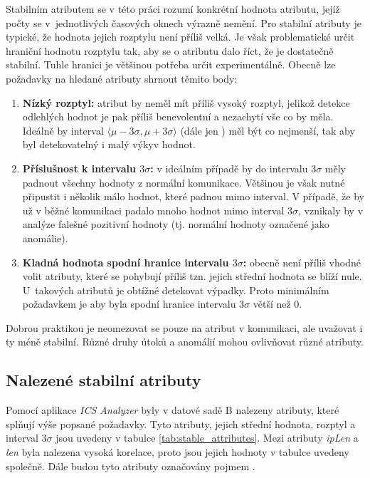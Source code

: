 Stabilním atributem se v této práci rozumí konkrétní hodnota atributu, jejíž počty se v~jednotlivých časových oknech výrazně nemění. Pro stabilní atributy je typické, že hodnota jejich rozptylu není příliš velká. Je však problematické určit hraniční hodnotu rozptylu tak, aby se o atributu dalo říct, že je dostatečně stabilní. Tuhle hranici je většinou potřeba určit experimentálně.
Obecně lze požadavky na hledané atributy shrnout těmito body:


\begin{enumerate}
    \item \textbf{Nízký rozptyl:} atribut by neměl mít příliš vysoký rozptyl, jelikož detekce odlehlých hodnot je pak příliš benevolentní a nezachytí vše co by měla. Ideálně by interval $\langle{\mu-3\sigma,\mu+3\sigma}\rangle$ (dále jen ) měl být co nejmenší, tak aby byl detekovatelný i malý výkyv hodnot.
    \item \textbf{Příslušnost k intervalu $3\sigma$:} v ideálním případě by do intervalu $3\sigma$ měly padnout všechny hodnoty z normální komunikace. Většinou je však nutné připustit i několik málo hodnot, které padnou mimo interval. V případě, že by už v běžné komunikaci padalo mnoho hodnot mimo interval $3\sigma$, vznikaly by v analýze falešné pozitivní hodnoty (tj. normální hodnoty označené jako anomálie).
    \item \textbf{Kladná hodnota spodní hranice intervalu $3\sigma$:} obecně není příliš vhodné volit atributy, které se pohybují příliš  tzn. jejich střední hodnota se blíží nule. U~takových atributů je obtížné detekovat výpadky. Proto minimálním požadavkem je aby byla spodní hranice intervalu $3\sigma$ větší než 0.
\end{enumerate}

\noindent Dobrou praktikou je neomezovat se pouze na  atribut v komunikaci, ale uvažovat i ty méně stabilní. Různé druhy útoků a anomálií mohou ovlivňovat různé atributy.

\subsection*{Nalezené stabilní atributy}

Pomocí aplikace \emph{ICS Analyzer} byly v datové sadě B nalezeny atributy, které splňují výše popsané požadavky. Tyto atributy, jejich střední hodnota, rozptyl a interval $3\sigma$ jsou uvedeny v tabulce \ref{tab:stable_attributes}. Mezi atributy \emph{ipLen} a \emph{len} byla nalezena vysoká korelace, proto jsou jejich hodnoty v tabulce uvedeny společně. Dále budou tyto atributy označovány pojmem .

